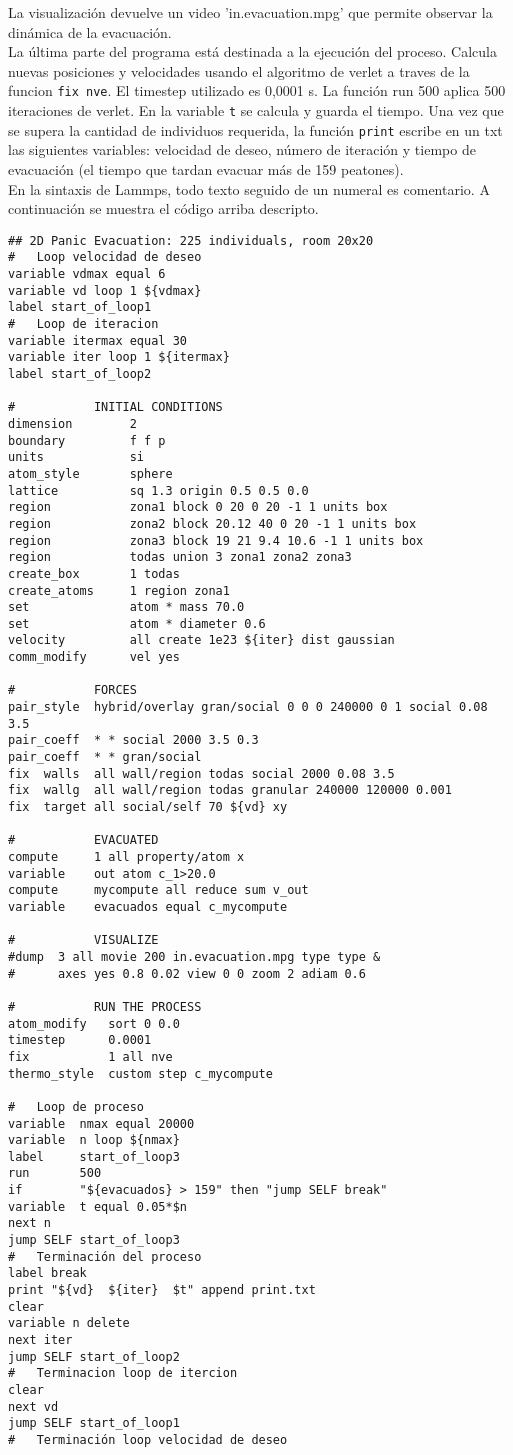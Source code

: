 La visualización devuelve un video 'in.evacuation.mpg' que permite observar la dinámica de la evacuación. \\
La última parte del programa está destinada a la ejecución del proceso. Calcula nuevas posiciones y velocidades usando el algoritmo de verlet a traves de la funcion {\tt fix nve}. El timestep utilizado es 0,0001 s. La función run 500 aplica 500 iteraciones de verlet. En la variable {\tt t} se calcula y guarda el tiempo. Una vez que se supera la cantidad de individuos requerida, la función {\tt print} escribe en un txt las siguientes variables: velocidad de deseo, número de iteración y  tiempo de evacuación (el tiempo que tardan evacuar más de 159 peatones).\\
En la sintaxis de Lammps, todo texto seguido de un numeral es comentario. A continuación se muestra el código arriba descripto.

\begin{verbatim}
## 2D Panic Evacuation: 225 individuals, room 20x20
#	Loop velocidad de deseo
variable vdmax equal 6
variable vd loop 1 ${vdmax}
label start_of_loop1
#	Loop de iteracion
variable itermax equal 30
variable iter loop 1 ${itermax}
label start_of_loop2

#           INITIAL CONDITIONS
dimension        2
boundary         f f p
units            si
atom_style       sphere
lattice          sq 1.3 origin 0.5 0.5 0.0
region           zona1 block 0 20 0 20 -1 1 units box
region           zona2 block 20.12 40 0 20 -1 1 units box
region           zona3 block 19 21 9.4 10.6 -1 1 units box
region           todas union 3 zona1 zona2 zona3
create_box       1 todas
create_atoms     1 region zona1
set              atom * mass 70.0
set              atom * diameter 0.6
velocity         all create 1e23 ${iter} dist gaussian
comm_modify      vel yes

#           FORCES
pair_style  hybrid/overlay gran/social 0 0 0 240000 0 1 social 0.08 3.5
pair_coeff  * * social 2000 3.5 0.3
pair_coeff  * * gran/social
fix  walls  all wall/region todas social 2000 0.08 3.5
fix  wallg  all wall/region todas granular 240000 120000 0.001    
fix  target all social/self 70 ${vd} xy          

#           EVACUATED
compute     1 all property/atom x
variable    out atom c_1>20.0
compute     mycompute all reduce sum v_out
variable    evacuados equal c_mycompute

#           VISUALIZE
#dump  3 all movie 200 in.evacuation.mpg type type &
#      axes yes 0.8 0.02 view 0 0 zoom 2 adiam 0.6

#           RUN THE PROCESS
atom_modify   sort 0 0.0
timestep      0.0001
fix           1 all nve
thermo_style  custom step c_mycompute

#	Loop de proceso
variable  nmax equal 20000
variable  n loop ${nmax}
label     start_of_loop3
run       500
if        "${evacuados} > 159" then "jump SELF break"
variable  t equal 0.05*$n
next n
jump SELF start_of_loop3
#	Terminación del proceso
label break
print "${vd}  ${iter}  $t" append print.txt
clear
variable n delete
next iter
jump SELF start_of_loop2
#	Terminacion loop de itercion
clear
next vd
jump SELF start_of_loop1
#	Terminación loop velocidad de deseo
\end{verbatim}

